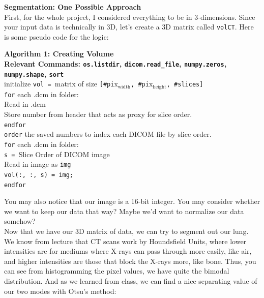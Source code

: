 \documentclass[10pt]{article}
\begin{document}
\clearpage
\noindent \Large \textbf{Segmentation: One Possible Approach} \normalsize \\
\noindent\makebox[\linewidth]{\rule{\textwidth}{0.4pt}}
\indent First, for the whole project, I considered everything to be in 3-dimensions.  Since your input data is technically in 3D, let's create a 3D matrix called \texttt{volCT}.  Here is some pseudo code for the logic:
\begin{center}
\begin{minipage}[c]{0.75\textwidth}
\noindent\makebox[\linewidth]{\rule{\textwidth}{0.4pt}}
\noindent \textbf{Algorithm 1: Creating Volume\\
Relevant Commands: \texttt{os.listdir}, \texttt{dicom.read\_file}, \texttt{numpy.zeros}, \texttt{numpy.shape}, \texttt{sort}}\\
\noindent\makebox[\linewidth]{\rule{\textwidth}{0.2pt}}
initialize \texttt{vol = }matrix of size \texttt{[\#pi$\text{x}_\text{width}$, \#pi$\text{x}_\text{height}$, \#slices]}\\
\texttt{for} each .dcm in folder:\\
\hspace*{1em} Read in .dcm\\
\hspace*{1em} Store number from header that acts as proxy for slice order.\\
\texttt{endfor}\\
\texttt{order} the saved numbers to index each DICOM file by slice order.\\
\texttt{for} each .dcm in folder:\\
\hspace*{1em} \texttt{s = }Slice Order of DICOM image\\
\hspace*{1em} Read in image as \texttt{img}\\
\hspace*{1em} \texttt{vol(:, :, s) = img;}\\
\texttt{endfor}\\
\noindent\makebox[\linewidth]{\rule{\textwidth}{0.2pt}}
\end{minipage}
\end{center}
You may also notice that our image is a 16-bit integer.  You may consider whether we want to keep our data that way?  Maybe we'd want to normalize our data somehow?\\
\indent Now that we have our 3D matrix of data, we can try to segment out our lung.  We know from lecture that CT scans work by Houndsfield Units, where lower intensities are for mediums where X-rays can pass through more easily, like air, and higher intensities are those that block the X-rays more, like bone.  Thus, you can see from histogramming the pixel values, we have quite the bimodal distribution.  And as we learned from class, we can find a nice separating value of our two modes with Otsu's method:
\end{document}
